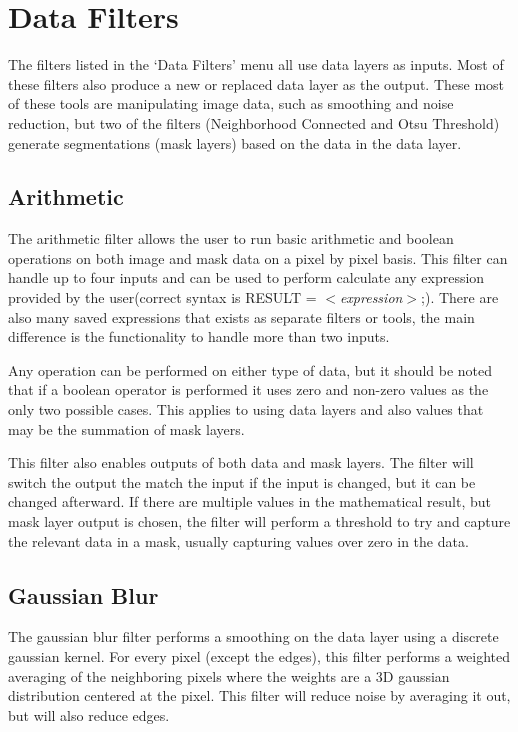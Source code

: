 \documentclass[fleqn,11pt,openany]{book}
\begin{document}
\section{Data Filters}

The filters listed in the `Data Filters' menu all use data layers as inputs.  Most of these filters also produce a new or replaced data layer as the output.  These most of these tools are manipulating image data, such as smoothing and noise reduction, but two of the filters (Neighborhood Connected and Otsu Threshold) generate segmentations (mask layers) based on the data in the data layer.  

\subsection{Arithmetic}

The arithmetic filter allows the user to run basic arithmetic and boolean operations on both image and mask data on a pixel by pixel basis.  This filter can handle up to four inputs and can be used to perform calculate any expression provided by the user(correct syntax is RESULT = \emph{$<$expression$>$};).  There are also many saved expressions that exists as separate filters or tools, the main difference is the functionality to handle more than two inputs.

Any operation can be performed on either type of data, but it should be noted that if a boolean operator is performed it uses zero and non-zero values as the only two possible cases.  This applies to using data layers and also values that may be the summation of mask layers.  

This filter also enables outputs of both data and mask layers.  The filter will switch the output the match the input if the input is changed, but it can be changed afterward.  If there are multiple values in the mathematical result, but mask layer output is chosen, the filter will perform a threshold to try and capture the relevant data in a mask, usually capturing values over zero in the data. 

\subsection{Gaussian Blur}
\label{sec:gaussianblur}

The gaussian blur filter performs a smoothing on the data layer using a discrete gaussian kernel.  For every pixel (except the edges), this filter performs a weighted averaging of the neighboring pixels where the weights are a 3D gaussian distribution centered at the pixel.  This filter will reduce noise by averaging it out, but will also reduce edges.  
\end{document}
